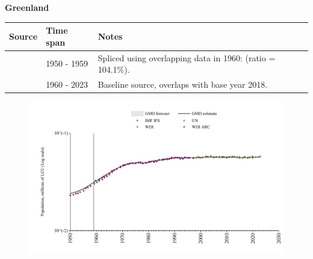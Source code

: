 \documentclass[12pt,a4paper,landscape]{article}
\begin{document}
\begin{adjustbox}{max totalsize={\paperwidth}{\paperheight},center}
\begin{minipage}[t][\textheight][t]{\textwidth}
\vspace*{0.5cm}
{}
\begin{center}
{\Large\bfseries Greenland}
\end{center}
\vspace{0.5cm}
\begin{table}[H]
\centering
\small
\begin{tabular}{|l|l|l|}
\hline
\textbf{Source} & \textbf{Time span} & \textbf{Notes} \\
\hline
\rowcolor{white}\cite{IMF_IFS}& 1950 - 1959 &Spliced using overlapping data in 1960: (ratio = 104.1\%).\\
\rowcolor{lightgray}\cite{WDI}& 1960 - 2023 &Baseline source, overlaps with base year 2018.\\
\hline
\end{tabular}
\end{table}
\begin{figure}[H]
\centering
\includegraphics[width=\textwidth,height=0.6\textheight,keepaspectratio]{graphs/GRL_pop.pdf}
\end{figure}
\end{minipage}
\end{adjustbox}
\end{document}
